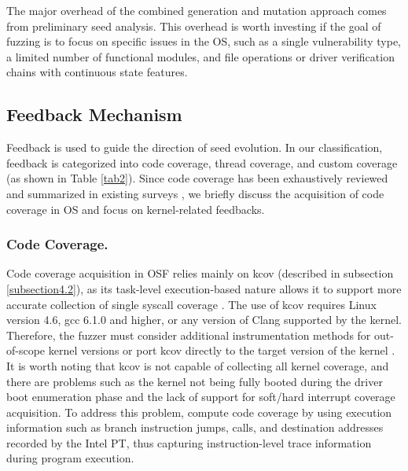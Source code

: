 The major overhead of the combined generation and mutation approach comes from preliminary seed analysis. This overhead is worth investing if the goal of fuzzing is to focus on specific issues in the OS, such as a single vulnerability type, a limited number of functional modules, and file operations or driver verification chains with continuous state features.


\subsection{Feedback Mechanism}
Feedback is used to guide the direction of seed evolution. In our classification, feedback is categorized into code coverage, thread coverage, and custom coverage (as shown in Table \ref{tab2}). Since code coverage has been exhaustively reviewed and summarized in existing surveys \cite{Li2018FuzzingAS, Mans2018TheAS, Liang2018FuzzingSO}, we briefly discuss the acquisition of code coverage in OS and focus on kernel-related feedbacks.

\subsubsection{Code Coverage.}
Code coverage acquisition in OSF relies mainly on kcov (described in subsection \ref{subsection4.2}), as its task-level execution-based nature allows it to support more accurate collection of single syscall coverage \cite{vyukov2018kcov}. The use of kcov requires Linux version 4.6, gcc 6.1.0 and higher, or any version of Clang supported by the kernel. Therefore, the fuzzer must consider additional instrumentation methods for out-of-scope kernel versions or port kcov directly to the target version of the kernel \cite{shi2019industry}. It is worth noting that kcov is not capable of collecting all kernel coverage, and there are problems such as the kernel not being fully booted during the driver boot enumeration phase and the lack of support for soft/hard interrupt coverage acquisition.
To address this problem, \cite{schumilo2017kafl,wu2023devfuzz,ma2022printfuzz, zhao2022semantic,schumilo2021nyx} compute code coverage by using execution information such as branch instruction jumps, calls, and destination addresses recorded by the Intel PT, thus capturing instruction-level trace information during program execution.


